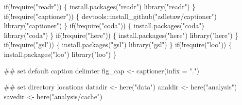 \documentclass[
  11pt,
]{article}
\newenvironment{Shaded}{}{}
\newcommand{\CommentTok}[1]{\textcolor[rgb]{0.00,0.50,0.00}{#1}}
\newcommand{\ControlFlowTok}[1]{\textcolor[rgb]{0.00,0.00,1.00}{#1}}
\newcommand{\DataTypeTok}[1]{#1}
\newcommand{\KeywordTok}[1]{\textcolor[rgb]{0.00,0.00,1.00}{#1}}
\newcommand{\NormalTok}[1]{#1}
\newcommand{\OperatorTok}[1]{#1}
\newcommand{\StringTok}[1]{\textcolor[rgb]{0.00,0.50,0.50}{#1}}
\begin{document}
\begin{Shaded}
\begin{Highlighting}[]
\ControlFlowTok{if}\NormalTok{(}\OperatorTok{!}\KeywordTok{require}\NormalTok{(}\StringTok{"readr"}\NormalTok{)) \{}
  \KeywordTok{install.packages}\NormalTok{(}\StringTok{"readr"}\NormalTok{)}
  \KeywordTok{library}\NormalTok{(}\StringTok{"readr"}\NormalTok{)}
\NormalTok{\}}
\ControlFlowTok{if}\NormalTok{(}\OperatorTok{!}\KeywordTok{require}\NormalTok{(}\StringTok{"captioner"}\NormalTok{)) \{}
\NormalTok{  devtools}\OperatorTok{::}\KeywordTok{install_github}\NormalTok{(}\StringTok{"adletaw/captioner"}\NormalTok{)}
  \KeywordTok{library}\NormalTok{(}\StringTok{"captioner"}\NormalTok{)}
\NormalTok{\}}
\ControlFlowTok{if}\NormalTok{(}\OperatorTok{!}\KeywordTok{require}\NormalTok{(}\StringTok{"coda"}\NormalTok{)) \{}
  \KeywordTok{install.packages}\NormalTok{(}\StringTok{"coda"}\NormalTok{)}
  \KeywordTok{library}\NormalTok{(}\StringTok{"coda"}\NormalTok{)}
\NormalTok{\}}
\ControlFlowTok{if}\NormalTok{(}\OperatorTok{!}\KeywordTok{require}\NormalTok{(}\StringTok{"here"}\NormalTok{)) \{}
  \KeywordTok{install.packages}\NormalTok{(}\StringTok{"here"}\NormalTok{)}
  \KeywordTok{library}\NormalTok{(}\StringTok{"here"}\NormalTok{)}
\NormalTok{\}}
\ControlFlowTok{if}\NormalTok{(}\OperatorTok{!}\KeywordTok{require}\NormalTok{(}\StringTok{"gsl"}\NormalTok{)) \{}
  \KeywordTok{install.packages}\NormalTok{(}\StringTok{"gsl"}\NormalTok{)}
  \KeywordTok{library}\NormalTok{(}\StringTok{"gsl"}\NormalTok{)}
\NormalTok{\}}
\ControlFlowTok{if}\NormalTok{(}\OperatorTok{!}\KeywordTok{require}\NormalTok{(}\StringTok{"loo"}\NormalTok{)) \{}
  \KeywordTok{install.packages}\NormalTok{(}\StringTok{"loo"}\NormalTok{)}
  \KeywordTok{library}\NormalTok{(}\StringTok{"loo"}\NormalTok{)}
\NormalTok{\}}

\CommentTok{## set default caption delimter}
\NormalTok{fig_cap <-}\StringTok{ }\KeywordTok{captioner}\NormalTok{(}\DataTypeTok{infix =} \StringTok{"."}\NormalTok{)}

\CommentTok{## set directory locations}
\NormalTok{datadir <-}\StringTok{ }\KeywordTok{here}\NormalTok{(}\StringTok{"data"}\NormalTok{)}
\NormalTok{analdir <-}\StringTok{ }\KeywordTok{here}\NormalTok{(}\StringTok{"analysis"}\NormalTok{)}
\NormalTok{savedir <-}\StringTok{ }\KeywordTok{here}\NormalTok{(}\StringTok{"analysis/cache"}\NormalTok{)}


\end{Highlighting}
\end{Shaded}
\end{document}
